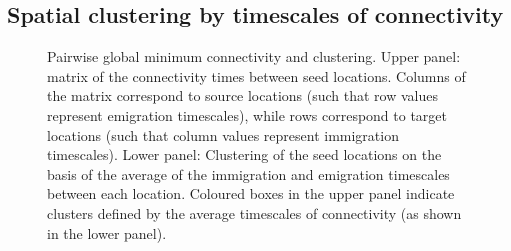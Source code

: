 \documentclass[12pt]{article}
\begin{document}
\subsection{Spatial clustering by timescales of connectivity}


\begin{figure}[htp!]

\caption{Pairwise global minimum connectivity and clustering. Upper panel: matrix of the connectivity times between seed locations. Columns of the matrix correspond to source locations (such that row values represent emigration timescales), while rows correspond to target locations (such that column values represent immigration timescales). Lower panel: Clustering of the seed locations on the basis of the average of the immigration and emigration timescales between each location. Coloured boxes in the upper panel indicate clusters defined by the average timescales of connectivity (as shown in the lower panel).}
\label{connectivity_matrices}
\end{figure}












\clearpage 
\end{document}
